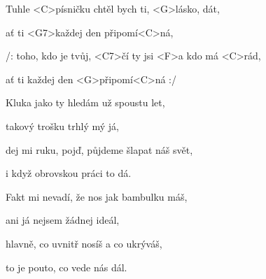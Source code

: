 

\zr
Tuhle <C>písničku chtěl bych ti, <G>lásko, dát,

ať ti <G7>každej den připomí<C>ná,

/: toho, kdo je tvůj, <C7>čí ty jsi <F>a kdo má <C>rád,

ať ti každej den <G>připomí<C>ná :/
\kr

\zs
Kluka jako ty hledám už spoustu let,

takový trošku trhlý mý já,

dej mi ruku, pojď, půjdeme šlapat náš svět,

i když obrovskou práci to dá.
\ks

\zr
\kr

\zs
Fakt mi nevadí, že nos jak bambulku máš,

ani já nejsem žádnej ideál,

hlavně, co uvnitř nosíš a co ukrýváš,

to je pouto, co vede nás dál.
\ks

\zr
\kr

\kp
